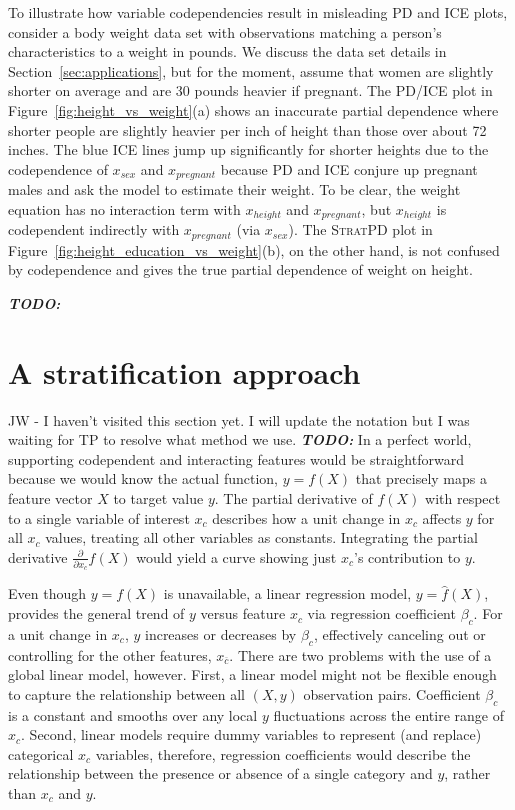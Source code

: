 \documentclass[12pt]{article}
\newcommand{\secref}[1]{Section~\ref{#1}}
\newcommand{\figref}[1]{Figure~\ref{#1}}
\newcommand{\todo}[1]{{\bf\em TODO:} {{\color{red}{#1}}}}
\newcommand{\spd}{\fontfamily{cmr}\textsc{\small StratPD}}
\newcommand{\xnc}{$x_{\overline{c}}$}
\begin{document}
To illustrate how variable codependencies result in misleading PD and ICE plots, consider a body weight data set with observations matching a person's characteristics to a weight in pounds. We discuss the data set details in \secref{sec:applications}, but for the moment, assume that women are slightly shorter on average and are 30 pounds heavier if pregnant. The PD/ICE plot in \figref{fig:height_vs_weight}(a) shows an inaccurate partial dependence where shorter people are slightly heavier per inch of height than those over about 72 inches. The blue ICE lines jump up significantly for shorter heights due to the codependence of $x_{sex}$ and $x_{pregnant}$ because PD and ICE conjure up pregnant males and ask the model to estimate their weight.  To be clear, the weight equation has no interaction term with $x_{height}$ and $x_{pregnant}$, but $x_{height}$ is codependent indirectly with $x_{pregnant}$ (via $x_{sex}$).  The \spd{} plot in \figref{fig:height_education_vs_weight}(b), on the other hand, is not confused by codependence and gives the true partial dependence of weight on height. 

\todo{needs a transition sentence here}

\section{A stratification approach}
{\color{red} JW - I haven't visited this section yet. I will update the notation but I was waiting for TP to resolve what method we use.}
\todo{this is probably the right time to say we simplify C to c single variable}
In a perfect world, supporting codependent and interacting features would be straightforward because we would know the actual function, $y = f(X)$ that precisely maps a feature vector $X$ to target value $y$. The partial derivative of $f(X)$ with respect to a single variable of interest $x_c$ describes how a unit change in $x_c$ affects $y$ for all $x_c$ values, treating all other variables as constants. Integrating the partial derivative $\frac{\partial}{\partial x_{c}} f(X)$ would yield a curve showing just $x_c$'s contribution to $y$. 

Even though $y = f(X)$ is unavailable, a linear regression model, $y = \hat{f}(X)$, provides the general trend of $y$ versus feature $x_c$ via regression coefficient $\beta_c$. For a unit change in $x_c$, $y$ increases or decreases by $\beta_c$, effectively canceling out or controlling for the other features, \xnc. There are two problems with the use of a global linear model, however.  First, a linear model might not be flexible enough to capture the relationship between all $(X,y)$ observation pairs. Coefficient $\beta_c$ is a constant and smooths over any local $y$ fluctuations across the entire range of $x_c$. Second, linear models require dummy variables to represent (and replace) categorical $x_c$ variables, therefore, regression coefficients would describe the relationship between the presence or absence of a single category and $y$, rather than $x_c$ and $y$.
\end{document}
